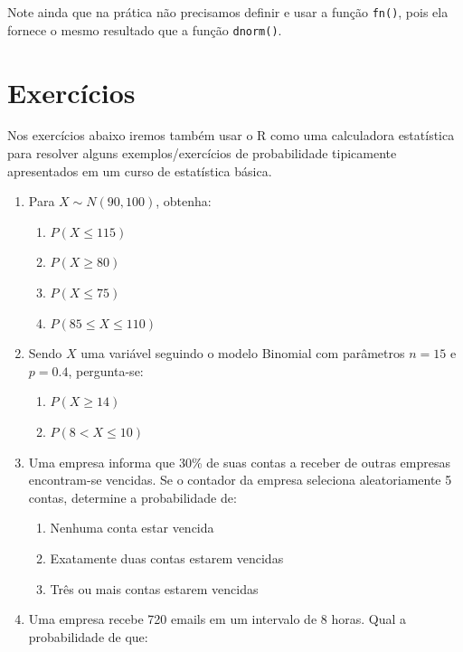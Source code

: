 \documentclass[10pt,a4paper]{book}
\providecommand{\tightlist}{%
  \setlength{\itemsep}{0pt}\setlength{\parskip}{0pt}}
\begin{document}
Note ainda que na prática não precisamos definir e usar a função
\texttt{fn()}, pois ela fornece o mesmo resultado que a função
\texttt{dnorm()}.

\section*{Exercícios}\label{exercuxedcios-17}


Nos exercícios abaixo iremos também usar o R como uma calculadora
estatística para resolver alguns exemplos/exercícios de probabilidade
tipicamente apresentados em um curso de estatística básica.

\begin{enumerate}
\def\labelenumi{\arabic{enumi}.}
\tightlist
\item
  Para \(X \sim N(90, 100)\), obtenha:

  \begin{enumerate}
  \def\labelenumii{\alph{enumii}.}
  \tightlist
  \item
    \(P(X \leq 115)\)
  \item
    \(P(X \geq 80)\)
  \item
    \(P(X \leq 75)\)
  \item
    \(P(85 \leq X \leq 110)\) 
  \end{enumerate}
\item
  Sendo \(X\) uma variável seguindo o modelo Binomial com parâmetros
  \(n = 15\) e \(p = 0.4\), pergunta-se:

  \begin{enumerate}
  \def\labelenumii{\alph{enumii}.}
  \tightlist
  \item
    \(P(X \geq 14)\)
  \item
    \(P(8 < X \leq 10)\) 
  \end{enumerate}
\item
  Uma empresa informa que 30\% de suas contas a receber de outras
  empresas encontram-se vencidas. Se o contador da empresa seleciona
  aleatoriamente 5 contas, determine a probabilidade de:

  \begin{enumerate}
  \def\labelenumii{\alph{enumii}.}
  \tightlist
  \item
    Nenhuma conta estar vencida
  \item
    Exatamente duas contas estarem vencidas
  \item
    Três ou mais contas estarem vencidas
  \end{enumerate}
\item
  Uma empresa recebe 720 emails em um intervalo de 8 horas. Qual a
  probabilidade de que:


\end{enumerate}
\end{document}
